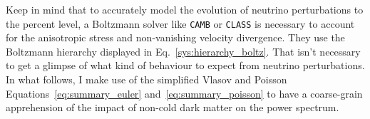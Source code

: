 Keep in mind that to accurately model the evolution of neutrino perturbations to the percent level, a Boltzmann solver like \texttt{CAMB} or \texttt{CLASS} is necessary to account for the anisotropic stress and non-vanishing velocity divergence. They use the Boltzmann hierarchy displayed in Eq.~\ref{sys:hierarchy_boltz}. That isn't necessary to get a glimpse of what kind of behaviour to expect from neutrino perturbations. In what follows, I make use of the simplified Vlasov and Poisson Equations~\ref{eq:summary_euler} and~\ref{eq:summary_poisson} to have a coarse-grain apprehension of the impact of non-cold dark matter on the power spectrum.

\clearpage